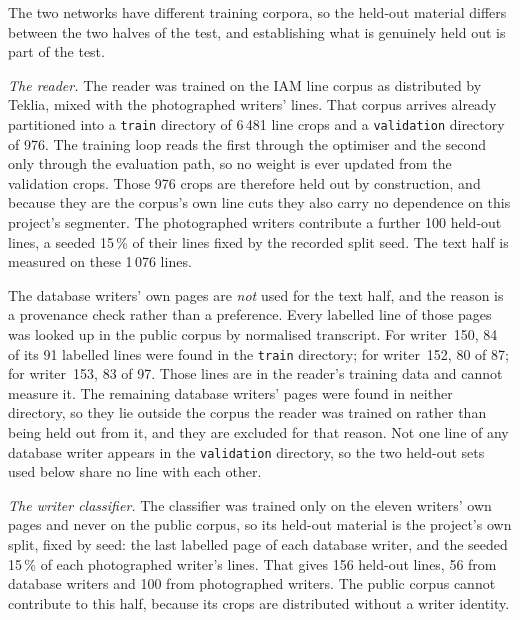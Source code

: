         \medskip

        The two networks have different training corpora, so the held-out
        material differs between the two halves of the test, and establishing
        what is genuinely held out is part of the test.

        \emph{The reader.} The reader was trained on the IAM line corpus as
        distributed by Teklia, mixed with the photographed writers' lines. That
        corpus arrives already partitioned into a \texttt{train} directory of
        6\,481 line crops and a \texttt{validation} directory of 976. The
        training loop reads the first through the optimiser and the second only
        through the evaluation path, so no weight is ever updated from the
        validation crops. Those 976 crops are therefore held out by
        construction, and because they are the corpus's own line cuts they also
        carry no dependence on this project's segmenter. The photographed
        writers contribute a further 100 held-out lines, a seeded 15\,\% of
        their lines fixed by the recorded split seed. The text half is measured
        on these 1\,076 lines.

        The database writers' own pages are \emph{not} used for the text half,
        and the reason is a provenance check rather than a preference. Every
        labelled line of those pages was looked up in the public corpus by
        normalised transcript. For writer~150, 84 of its 91 labelled lines were
        found in the \texttt{train} directory; for writer~152, 80 of 87; for
        writer~153, 83 of 97. Those lines are in the reader's training data and
        cannot measure it. The remaining database writers' pages were found in
        neither directory, so they lie outside the corpus the reader was trained
        on rather than being held out from it, and they are excluded for that
        reason. Not one line of any database writer appears in the
        \texttt{validation} directory, so the two held-out sets used below share
        no line with each other.

        \emph{The writer classifier.} The classifier was trained only on the
        eleven writers' own pages and never on the public corpus, so its
        held-out material is the project's own split, fixed by seed: the last
        labelled page of each database writer, and the seeded 15\,\% of each
        photographed writer's lines. That gives 156 held-out lines, 56 from
        database writers and 100 from photographed writers. The public
        corpus cannot contribute to this half, because its crops are
        distributed without a writer identity.

